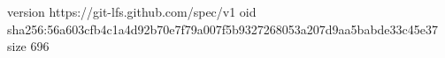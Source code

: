 version https://git-lfs.github.com/spec/v1
oid sha256:56a603cfb4c1a4d92b70e7f79a007f5b9327268053a207d9aa5babde33c45e37
size 696
